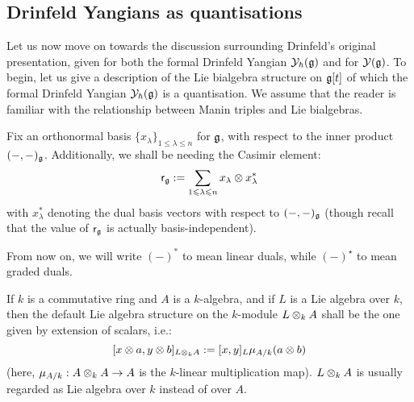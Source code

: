     \subsection{Drinfeld Yangians as quantisations}
        Let us now move on towards the discussion surrounding Drinfeld's original presentation, given for both the formal Drinfeld Yangian $\mathcal{Y}_{\hbar}(\mathfrak{g})$ and for $\mathcal{Y}(\mathfrak{g})$. To begin, let us give a description of the Lie bialgebra structure on $\mathfrak{g}[t]$ of which the formal Drinfeld Yangian $\mathcal{Y}_{\hbar}(\mathfrak{g})$ is a quantisation. We assume that the reader is familiar with the relationship between Manin triples and Lie bialgebras.

        \begin{convention}
            Fix an orthonormal basis $\{x_{\lambda}\}_{1 \leq \lambda \leq n}$ for $\mathfrak{g}$, with respect to the inner product $(-, -)_{\mathfrak{g}}$. Additionally, we shall be needing the Casimir element:
                $$\sfr_{\g} := \sum_{1 \leq \lambda \leq n} x_{\lambda} \tensor x_{\lambda}^*$$
            with $x_{\lambda}^*$ denoting the dual basis vectors with respect to $(-, -)_{\mathfrak{g}}$ (though recall that the value of $\mathsf{r}_{\mathfrak{g}}$ is actually basis-independent).
        \end{convention}
        \begin{convention}
            From now on, we will write $(-)^*$ to mean linear duals, while $(-)^{\star}$ to mean graded duals. 
        \end{convention}
        \begin{convention}
            If $k$ is a commutative ring and $A$ is a $k$-algebra, and if $L$ is a Lie algebra over $k$, then the default Lie algebra structure on the $k$-module $L \tensor_k A$ shall be the one given by extension of scalars, i.e.:
                $$[x \tensor a, y \tensor b]_{L \tensor_k A} := [x, y]_L \mu_{A/k}(a \tensor b)$$
            (here, $\mu_{A/k}: A \tensor_k A \to A$ is the $k$-linear multiplication map). $L \tensor_k A$ is usually regarded as Lie algebra over $k$ instead of over $A$.  
        \end{convention}
        
